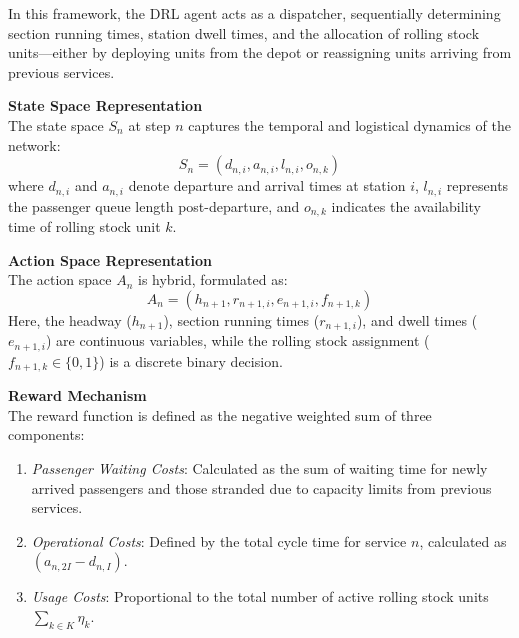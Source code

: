 \documentclass[a4paper]{scrartcl}
\begin{document}
In this framework, the DRL agent acts as a dispatcher, sequentially determining section running times, station dwell times, and the allocation of rolling stock units—either by deploying units from the depot or reassigning units arriving from previous services.

\textbf{State Space Representation} \\
The state space $S_n$ at step $n$ captures the temporal and logistical dynamics of the network:
\begin{equation}
S_n = (d_{n,i}, a_{n,i}, l_{n,i}, o_{n,k})
\end{equation}
where $d_{n,i}$ and $a_{n,i}$ denote departure and arrival times at station $i$, $l_{n,i}$ represents the passenger queue length post-departure, and $o_{n,k}$ indicates the availability time of rolling stock unit $k$.

\textbf{Action Space Representation} \\
The action space $A_n$ is hybrid, formulated as:
\begin{equation}
A_n = (h_{n+1}, r_{n+1,i}, e_{n+1,i}, f_{n+1,k})
\end{equation}
Here, the headway ($h_{n+1}$), section running times ($r_{n+1,i}$), and dwell times ($e_{n+1,i}$) are continuous variables, while the rolling stock assignment ($f_{n+1,k} \in \{0, 1\}$) is a discrete binary decision.

\textbf{Reward Mechanism} \\
The reward function is defined as the negative weighted sum of three components:
\begin{enumerate}
    \item \textit{Passenger Waiting Costs}: Calculated as the sum of waiting time for newly arrived passengers and those stranded due to capacity limits from previous services.
    \item \textit{Operational Costs}: Defined by the total cycle time for service $n$, calculated as $(a_{n,2I} - d_{n,I})$.
    \item \textit{Usage Costs}: Proportional to the total number of active rolling stock units $\sum_{k \in K} \eta_k$.
\end{enumerate}
\end{document}
